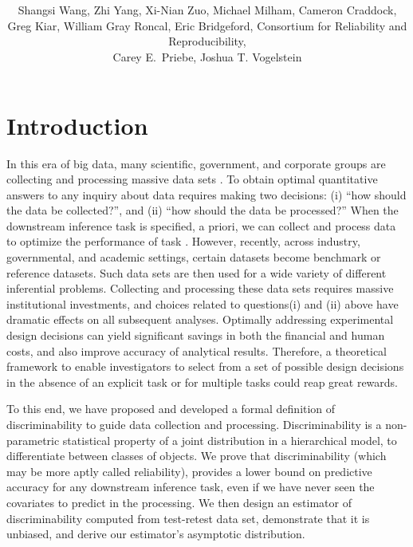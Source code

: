 \documentclass{article}
\title{\vspace{-50pt}
\db{Optimal Design for Discovery Science via Maximizing Discriminability: \\ Applications in Neuroimaging}
}
\author{Shangsi Wang, Zhi Yang, Xi-Nian Zuo, Michael Milham, Cameron Craddock,  \\ 
Greg Kiar, William Gray Roncal, Eric Bridgeford,
Consortium for Reliability and Reproducibility, \\ Carey E.~Priebe, Joshua T. Vogelstein}
\begin{document}
\maketitle
\tableofcontents
\newpage
\linenumbers

\section{Introduction}

In this era of big data, many scientific, government, and corporate groups are collecting and processing massive data sets \cite{manyika2011big}\cite{wu2014data}. To obtain optimal quantitative answers to any inquiry about data requires making two decisions: (i) “how should the data be collected?”, and (ii) “how should the data be processed?”  When the downstream inference task is specified, a priori, we can collect and process data to optimize the performance of task \cite{kohavi1995study}\cite{reiter2011mprophet}. However, recently, across industry, governmental, and academic settings, certain datasets become benchmark or reference datasets. Such data sets are then used for a wide variety of different inferential problems. Collecting and processing these data sets requires massive institutional investments, and choices related to questions(i) and (ii) above have dramatic effects on all subsequent analyses. Optimally addressing experimental design decisions can yield significant savings in both the financial and human costs, and also improve accuracy of analytical results\cite{ballou1985modeling}\cite{dale1999optimal}\cite{banga2008parameter}. Therefore, a theoretical framework to enable investigators to select from a set of possible design decisions in the absence of an explicit task or for multiple tasks could reap great rewards.



 
To this end, we have proposed and developed a formal definition of discriminability to guide data collection and processing. Discriminability is a non-parametric statistical property of a joint distribution in a hierarchical model, to differentiate between classes of objects. We prove that discriminability (which may be more aptly called reliability), provides a lower bound on predictive accuracy for any downstream inference task, even if we have never seen the covariates to predict in the processing. We then design an estimator of discriminability computed from test-retest data set, demonstrate that it is unbiased, and derive our estimator’s asymptotic distribution. 
\end{document}
